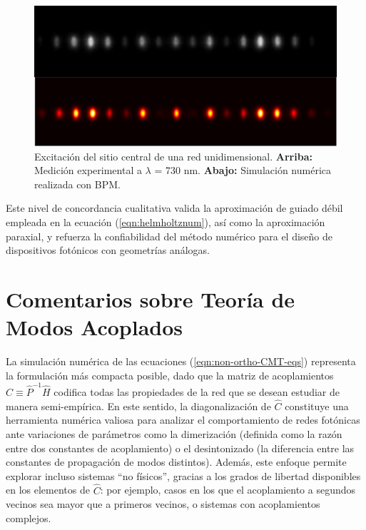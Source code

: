 \begin{figure}[H]
\centering
\includegraphics[width=\linewidth]{media/num_exp_comparison.png}
\caption[Excitación del sitio central de una red unidimensional.]{ Excitación del sitio central de una red unidimensional.
\textbf{Arriba:} Medición experimental a $\lambda$ = 730 nm.
\textbf{Abajo:} Simulación numérica realizada con BPM.
\label{fig:num-exp-comp}} \end{figure} Este nivel de concordancia cualitativa valida la aproximación de guiado débil empleada en la ecuación (\ref{eqn:helmholtznum}), así como la aproximación paraxial, y refuerza la confiabilidad del método numérico para el diseño de dispositivos fotónicos con geometrías análogas.
\section{Comentarios sobre Teoría de Modos Acoplados \label{cap:CMT}}
La simulación numérica de las ecuaciones (\ref{eqn:non-ortho-CMT-eqs}) representa la formulación más compacta posible, dado que la matriz de acoplamientos $\hat{C} \equiv \hat{P}^{-1}\hat{H}$ codifica todas las propiedades de la red que se desean estudiar de manera semi-empírica. En este sentido, la diagonalización de $\hat{C}$ constituye una herramienta numérica valiosa para analizar el comportamiento de redes fotónicas ante variaciones de parámetros como la dimerización (definida como la razón entre dos constantes de acoplamiento) o el desintonizado (la diferencia entre las constantes de propagación de modos distintos). 
Además, este enfoque permite explorar incluso sistemas ``no físicos'', gracias a los grados de libertad disponibles en los elementos de $\hat{C}$: por ejemplo, casos en los que el acoplamiento a segundos vecinos sea mayor que a primeros vecinos, o sistemas con acoplamientos complejos.

